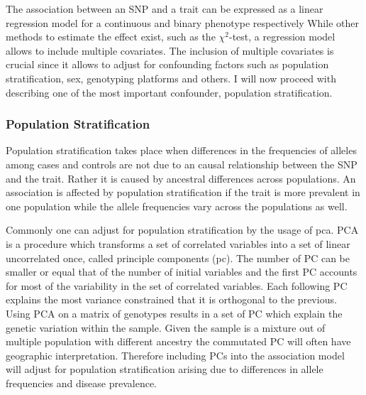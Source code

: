 The association between an SNP and a trait can be expressed as a linear regression model for a continuous and binary phenotype respectively
While other methods to estimate the effect exist, such as the $\chi^2$-test, a regression model allows to include multiple covariates.
The inclusion of multiple covariates is crucial since it allows to adjust for confounding factors such as population stratification, sex, genotyping platforms and others.
I will now proceed with describing one of the most important confounder, population stratification.

\subsubsection{Population Stratification}
\label{ssub:population_stratification}
Population stratification takes place when differences in the frequencies of alleles among cases and controls are not due to an causal relationship between the SNP and the trait.
Rather it is caused by ancestral differences across populations.
An association is affected by population stratification if the trait is more prevalent in one population while the allele frequencies vary across the populations as well.

Commonly one can adjust for population stratification by the usage of \acrfull{pca}.
PCA is a procedure which transforms a set of correlated variables into a set of linear uncorrelated once, called principle components (\acrshort{pc}).
The number of PC can be smaller or equal that of the number of initial variables and the first PC accounts for most of the variability in the set of correlated variables.
Each following PC explains the most variance constrained that it is orthogonal to the previous.
Using PCA on a matrix of genotypes results in a set of PC which explain the genetic variation within the sample.
Given the sample is a mixture out of multiple population with different ancestry the commutated PC will often have geographic interpretation.
Therefore including PCs into the association model will adjust for population stratification arising due to differences in allele frequencies and disease prevalence.

